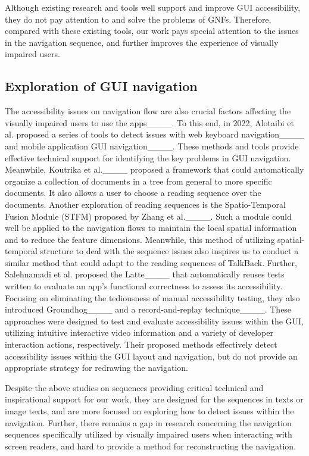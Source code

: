 Although existing research and tools well support and improve GUI accessibility, they do not pay attention to and solve the problems of GNFs.
Therefore, compared with these existing tools, our work pays special attention to the issues in the navigation sequence, and further improves the experience of visually impaired users.

\subsection{Exploration of GUI navigation}

The accessibility issues on navigation flow are also crucial factors affecting the visually impaired users to use the apps____.
To this end, in 2022, Alotaibi et al. proposed a series of tools to detect issues with web keyboard navigation____ and mobile application GUI navigation____.
These methods and tools provide effective technical support for identifying the key problems in GUI navigation.
Meanwhile, Koutrika et al.____ proposed a framework that could automatically organize a collection of documents in a tree from general to more specific documents.
It also allows a user to choose a reading sequence over the documents.
Another exploration of reading sequences is the Spatio-Temporal Fusion Module (STFM) proposed by Zhang et al.____.
Such a module could well be applied to the navigation flows to maintain the local spatial information and to reduce the feature dimensions.
Meanwhile, this method of utilizing spatial-temporal structure to deal with the sequence issues also inspires us to conduct a similar method that could adapt to the reading sequences of TalkBack.
Further, Salehnamadi et al. proposed the Latte____ that automatically reuses tests written to evaluate an app’s functional correctness to assess its accessibility.
Focusing on eliminating the tediousness of manual accessibility testing, they also introduced Groundhog____ and a record-and-replay technique____.
These approaches were designed to test and evaluate accessibility issues within the GUI, utilizing intuitive interactive video information and a variety of developer interaction actions, respectively.
Their proposed methods effectively detect accessibility issues within the GUI layout and navigation, but do not provide an appropriate strategy for redrawing the navigation.

Despite the above studies on sequences providing critical technical and inspirational support for our work, they are designed for the sequences in texts or image texts, and are more focused on exploring how to detect issues within the navigation.
Further, there remains a gap in research concerning the navigation sequences specifically utilized by visually impaired users when interacting with screen readers, and hard to provide a method for reconstructing the navigation.